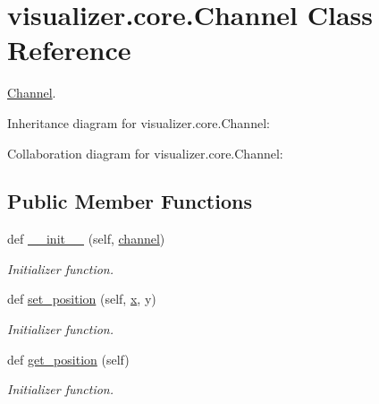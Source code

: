 \hypertarget{classvisualizer_1_1core_1_1Channel}{}\section{visualizer.\+core.\+Channel Class Reference}
\label{classvisualizer_1_1core_1_1Channel}


\hyperlink{classvisualizer_1_1core_1_1Channel}{Channel}.  




Inheritance diagram for visualizer.\+core.\+Channel\+:


Collaboration diagram for visualizer.\+core.\+Channel\+:
\subsection*{Public Member Functions}
\begin{DoxyCompactItemize}
\item 
def \hyperlink{classvisualizer_1_1core_1_1Channel_a4ee23cc1a07e713e63de40892b64fa11}{\+\_\+\+\_\+init\+\_\+\+\_\+} (self, \hyperlink{classvisualizer_1_1core_1_1Channel_a8f239a442e80fab3c2d40e4bd4683b15}{channel})
\begin{DoxyCompactList}\small\item\em Initializer function. \end{DoxyCompactList}\item 
def \hyperlink{classvisualizer_1_1core_1_1Channel_a1c867aded25c8b525413da8b645da0fb}{set\+\_\+position} (self, \hyperlink{lte__link__budget__x2__handover__measures_8m_a9336ebf25087d91c818ee6e9ec29f8c1}{x}, y)
\begin{DoxyCompactList}\small\item\em Initializer function. \end{DoxyCompactList}\item 
def \hyperlink{classvisualizer_1_1core_1_1Channel_ae1cc74b9c19233d89a9b6479324b0e65}{get\+\_\+position} (self)
\begin{DoxyCompactList}\small\item\em Initializer function. \end{DoxyCompactList}\end{DoxyCompactItemize}
